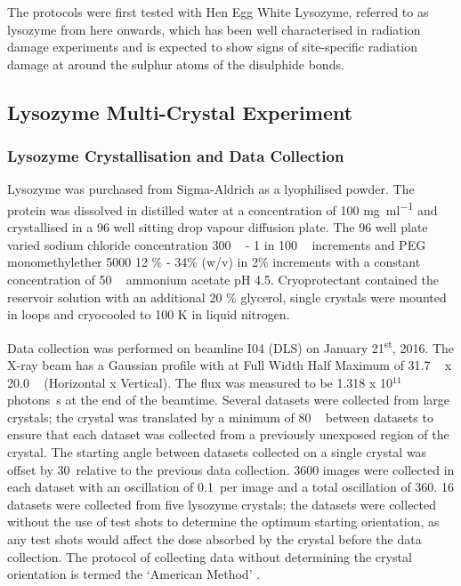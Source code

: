 The protocols were first tested with Hen Egg White Lysozyme, referred to as lysozyme from here onwards, which has been well characterised in radiation damage experiments and is expected to show signs of site-specific radiation damage at around the sulphur atoms of the disulphide bonds.
  
\subsection{Lysozyme Multi-Crystal Experiment}
\subsubsection*{Lysozyme Crystallisation and Data Collection}	
Lysozyme was purchased from Sigma-Aldrich as a lyophilised powder. The protein was dissolved in distilled water at a concentration of 100 \si{\milli\gram\per\milli\litre} and crystallised in a 96 well sitting drop vapour diffusion plate. The 96 well plate varied sodium chloride concentration 300 \si{\milli\molar} - 1 \si{\molar} in 100 \si{\milli\molar} increments and PEG monomethylether 5000 12 \% - 34\% (w/v) in 2\% increments with a constant concentration of 50 \si{\milli\molar} ammonium acetate pH 4.5. Cryoprotectant contained the reservoir solution with an additional 20 \% glycerol, single crystals were mounted in loops and cryocooled to 100 K in liquid nitrogen. 

Data collection was performed on beamline I04 (DLS) on January 21\textsuperscript{st}, 2016. The X-ray beam has a Gaussian profile with at Full Width Half Maximum of 31.7 \um~ x 20.0 \um~ (Horizontal x Vertical). The flux was measured to be 1.318 x 10$^{11}$ photons\si{\per\second} at the end of the beamtime. Several datasets were collected from large crystals; the crystal was translated by a minimum of 80 \um~ between datasets to ensure that each dataset was collected from a previously unexposed region of the crystal. The starting angle between datasets collected on a single crystal was offset by 30\degree ~relative to the previous data collection. 3600 images were collected in each dataset with an oscillation of 0.1\degree ~per image and a total oscillation of 360\degree. 16 datasets were collected from five lysozyme crystals; the datasets were collected without the use of test shots to determine the optimum starting orientation, as any test shots would affect the dose absorbed by the crystal before the data collection. The protocol of collecting data without determining the crystal orientation is termed the `American Method' \cite{Rossmann1983}.

